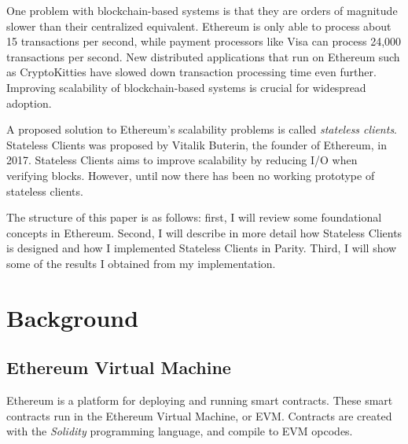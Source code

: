 \documentclass[12pt]{article}
\begin{document}
One problem with blockchain-based systems is that they are orders of magnitude slower than their centralized equivalent. Ethereum is only able to process about 15 transactions per second, while payment processors like Visa can process 24,000 transactions per second. New distributed applications that run on Ethereum such as CryptoKitties have slowed down transaction processing time even further. Improving scalability of blockchain-based systems is crucial for widespread adoption.

A proposed solution to Ethereum's scalability problems is called \emph{stateless clients}. Stateless Clients was proposed by Vitalik Buterin, the founder of Ethereum, in 2017. Stateless Clients aims to improve scalability by reducing I/O when verifying blocks. However, until now there has been no working prototype of stateless clients.

The structure of this paper is as follows: first, I will review some foundational concepts in Ethereum. Second, I will describe in more detail how Stateless Clients is designed and how I implemented Stateless Clients in Parity. Third, I will show some of the results I obtained from my implementation.

\section{Background}

\subsection{Ethereum Virtual Machine}

Ethereum is a platform for deploying and running smart contracts. These smart contracts run in the Ethereum Virtual Machine, or EVM. Contracts are created with the \emph{Solidity} programming language, and compile to EVM opcodes.
\end{document}
